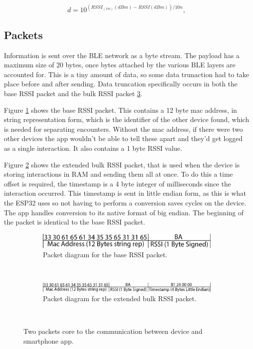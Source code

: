 \documentclass{l4proj}
\begin{document}
\begin{equation}
    {d}=10^{{({{RSSI}_{(1m)}{(dBm)}} - {RSSI(dBm)})} / {10n}},
    \label{eq:rssi-to-distance}
\end{equation}

\subsection{Packets}

Information is sent over the BLE network as a byte stream. The payload has a maximum size of 20 bytes, once bytes attached by the various BLE layers are accounted for. This is a tiny amount of data, so some data trunaction had to take place before and after sending. Data truncation specifically occurs in both the base RSSI packet and the bulk RSSI packet \ref{fig:main_packets}.

Figure \ref{fig:rssi_packet} shows the base RSSI packet. This contains a 12 byte mac address, in string representation form, which is the identifier of the other device found, which is needed for separating encounters. Without the mac address, if there were two other devices the app wouldn't be able to tell these apart and they'd get logged as a single interaction. It also contains a 1 byte RSSI value.

Figure \ref{fig:bulk_packet} shows the extended bulk RSSI packet, that is used when the device is storing interactions in RAM and sending them all at once. To do this a time offset is required, the timestamp is a 4 byte integer of milliseconds since the interaction occurred. This timestamp is sent in little endian form, as this is what the ESP32 uses so not having to perform a conversion saves cycles on the device. The app handles conversion to its native format of big endian. The beginning of the packet is identical to the base RSSI packet.

\begin{figure}[!htb]
    \centering
    \begin{subfigure}[b]{0.8\textwidth}
        \includegraphics[width=\textwidth]{images/rssi_packet.png}
        \caption{Packet diagram for the base RSSI packet.}
        \label{fig:rssi_packet}
    \end{subfigure}
    ~
    \begin{subfigure}[b]{1.0\textwidth}
        \includegraphics[width=\textwidth]{images/bulk_packet.png}
        \caption{Packet diagram for the extended bulk RSSI packet.}
        \label{fig:bulk_packet}
    \end{subfigure}
    ~
    \caption{ Two packets core to the communication between device and smartphone app. }
    \label{fig:main_packets}
\end{figure}
\end{document}

